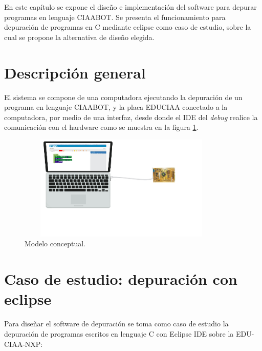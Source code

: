 En este capítulo se expone el diseño e implementación del software para depurar programas en lenguaje CIAABOT. Se
presenta el funcionamiento para depuración de programas en C mediante eclipse como caso de estudio, sobre la cual se propone la alternativa de diseño elegida.


\section{Descripción general}
\label{sec:Descripción general}

El sistema se compone de una computadora ejecutando la depuración de un programa en lenguaje CIAABOT, y la placa EDUCIAA conectado a la computadora, por medio de una interfaz, desde donde el IDE del \emph{debug} realice la comunicación con el hardware como se muestra en la figura \ref{fig:pc-bloques}.

\begin{figure}[!htbp]
    \begin{center}  %
	\includegraphics*[width=10cm,height=5cm]{./Figures/pc-bloques.png}
	\par\caption{Modelo conceptual.}\label{fig:pc-bloques}
	\end{center}
\end{figure}


\section{Caso de estudio: depuración con eclipse}
\label{sec:Alternativa de diseño}

Para diseñar el software de depuración se toma como caso de estudio la depuración de programas escritos en lenguaje C con Eclipse IDE sobre la EDU-CIAA-NXP:

